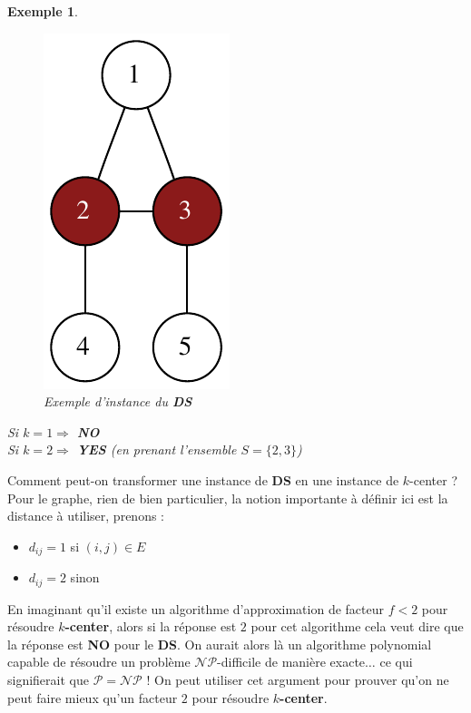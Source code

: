 \documentclass{article}
\newcommand{\titre}[1]{\textcolor{title}{#1}}
\newtheorem{exemple}{Exemple}[section]
\begin{document}
\begin{sffamily}
\newpage

\begin{exemple}$ $\\

\begin{figure}[h!]
    \begin{center}
    \includegraphics[scale=0.5]{inst_ds.pdf}
    \caption{Exemple d'instance du \textbf{\titre{DS}}}
    \end{center}	
\end{figure}
\noindent Si $k=1 \Rightarrow$ \textbf{NO} \\
Si $k=2 \Rightarrow$ \textbf{YES} \textit{(en prenant l'ensemble $S=\{2,3\}$)}
\end{exemple}

Comment peut-on transformer une instance de \textbf{\titre{DS}} en une instance de $k$-center ? Pour le graphe, rien de bien particulier, 
la notion importante à définir ici est la distance à utiliser, prenons :
\begin{itemize}
\item $d_{ij} = 1$ si $(i,j) \in E$
\item $d_{ij} = 2$ sinon \\
\end{itemize}

En imaginant qu'il existe un algorithme d'approximation de facteur $f < 2$ pour résoudre \textbf{$k$-center}, alors si la réponse est $2$ 
pour cet algorithme cela veut dire que la réponse est \textbf{NO} pour le \textbf{\titre{DS}}. On aurait alors là un algorithme 
polynomial capable de résoudre un problème $\mathcal{NP}$-difficile de manière exacte$\ldots$ ce qui signifierait que $\mathcal{P=NP}$ !
On peut utiliser cet argument pour prouver qu'on ne peut faire mieux qu'un facteur $2$ pour résoudre \textbf{$k$-center}.


\end{sffamily}
\end{document}
